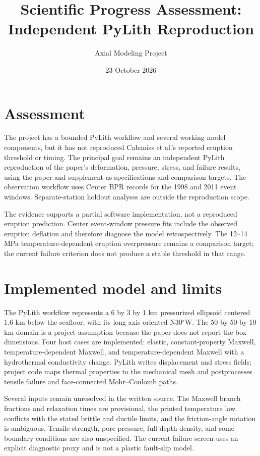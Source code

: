 \documentclass[10pt]{article}
\title{Scientific Progress Assessment: Independent PyLith Reproduction}
\author{Axial Modeling Project}
\date{23 October 2026}
\begin{document}
\maketitle

\section*{Assessment}
The project has a bounded PyLith workflow and several working model components,
but it has not reproduced Cabaniss et al.'s reported eruption threshold or
timing. The principal goal remains an independent PyLith reproduction of the
paper's deformation, pressure, stress, and failure results, using the paper and
supplement as specifications and comparison targets. The observation workflow
uses Center BPR records for the 1998 and 2011 event windows. Separate-station
holdout analyses are outside the reproduction scope.

The evidence supports a partial software implementation, not a reproduced
eruption prediction. Center event-window pressure fits include the observed
eruption deflation and therefore diagnose the model retrospectively. The
12--14 MPa temperature-dependent eruption overpressure remains a comparison
target; the current failure criterion does not produce a stable threshold in
that range.

\section*{Implemented model and limits}
The PyLith workflow represents a 6 by 3 by 1 km pressurized ellipsoid centered
1.6 km below the seafloor, with its long axis oriented N30$^\circ$W. The
50 by 50 by 10 km domain is a project assumption because the paper does not
report the box dimensions. Four host cases are implemented: elastic,
constant-property Maxwell, temperature-dependent Maxwell, and
temperature-dependent Maxwell with a hydrothermal conductivity change.
PyLith writes displacement and stress fields; project code maps thermal
properties to the mechanical mesh and postprocesses tensile failure and
face-connected Mohr--Coulomb paths.

Several inputs remain unresolved in the written source. The Maxwell branch
fractions and relaxation times are provisional, the printed temperature law
conflicts with the stated brittle and ductile limits, and the friction-angle
notation is ambiguous. Tensile strength, pore pressure, full-depth density,
and some boundary conditions are also unspecified. The current failure screen
uses an explicit diagnostic proxy and is not a plastic fault-slip model.
\end{document}
